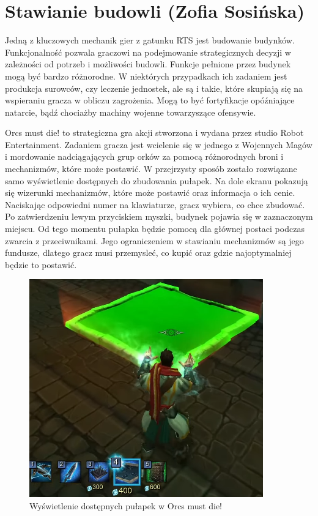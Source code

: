 \section{Stawianie budowli (Zofia Sosińska)}\label{chap:omd}
Jedną z kluczowych mechanik gier z gatunku RTS jest budowanie budynków. Funkcjonalność pozwala graczowi 
na podejmowanie strategicznych decyzji w zależności od potrzeb i możliwości budowli. Funkcje pełnione 
przez budynek mogą być bardzo różnorodne. W niektórych przypadkach ich zadaniem jest produkcja surowców, czy leczenie
jednostek, ale są i takie, które skupiają się na wspieraniu gracza w obliczu zagrożenia. Mogą to być fortyfikacje opóźniające natarcie,
bądź chociażby machiny wojenne towarzyszące ofensywie.

Orcs must die! to strategiczna gra akcji stworzona i wydana przez studio Robot Entertainment. Zadaniem gracza jest wcielenie się
w jednego z Wojennych Magów i mordowanie nadciągających grup orków za pomocą różnorodnych broni i mechanizmów, które może postawić.
W przejrzysty sposób zostało rozwiązane samo wyświetlenie dostępnych do zbudowania pułapek. Na dole ekranu pokazują się wizerunki mechanizmów,
które może postawić oraz informacja o ich cenie. Naciskając odpowiedni numer na klawiaturze, gracz wybiera, co chce zbudować. Po zatwierdzeniu lewym przyciskiem myszki,
budynek pojawia się w zaznaczonym miejscu. Od tego momentu pułapka będzie pomocą dla głównej postaci podczas zwarcia z przeciwnikami.
Jego ograniczeniem w stawianiu mechanizmów są jego fundusze, dlatego gracz musi przemysleć, co kupić oraz gdzie najoptymalniej będzie to postawić.

\begin{figure}[h!tbp]
    \centering
    \includegraphics[width=0.9\textwidth]{images/ui/buoildingsOrcs.png}
    \caption{Wyświetlenie dostępnych pułapek w Orcs must die!}\label{fig:Orcs}
\end{figure}